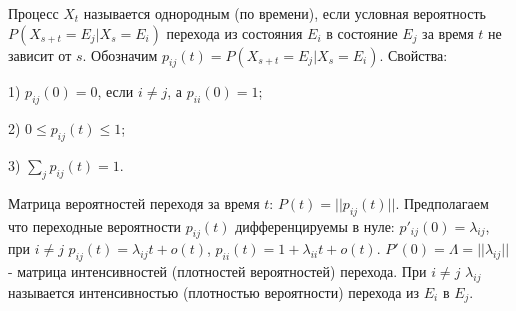 Процесс $X_t$ называется однородным (по времени), если условная вероятность $P(X_{s+t}=E_j|X_s=E_i)$ перехода из состояния $E_i$ в состояние $E_j$ за время $t$ не зависит от $s$.
Обозначим $p_{ij}(t)=P(X_{s+t}=E_j | X_s=E_i)$.
Свойства:

1) $p_{ij}(0)=0$, если $i\ne j$, а $p_{ii}(0)=1$;

2) $0\leq p_{ij}(t)\leq 1$;

3) $\sum _j p_{ij}(t)=1$.

Матрица вероятностей переходя за время $t$: $P(t)=||p_{ij}(t)||$.
Предполагаем что переходные вероятности $p_{ij}(t)$ дифференцируемы в нуле: $p'_{ij}(0)=\lambda_{ij}$, при $i\ne j$ $p_{ij}(t)=\lambda_{ij}t+o(t)$, $p_{ii}(t)=1+\lambda_{ii}t+o(t)$.
$P'(0)=\Lambda=||\lambda_{ij}||$ - матрица интенсивностей (плотностей вероятностей) перехода.
При $i\ne j$ $\lambda_{ij}$ называется интенсивностью (плотностью вероятности) перехода из $E_i$ в $E_j$.
